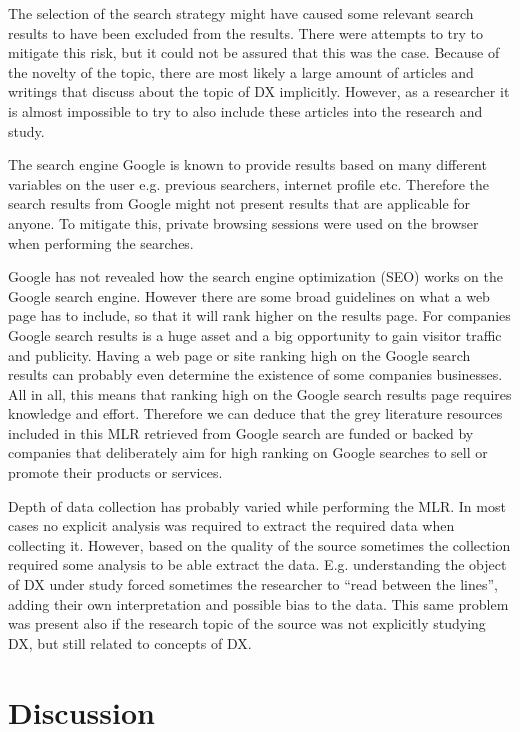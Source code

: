 \documentclass[english, 12pt, a4paper, sci, utf8, a-1b, online]{aaltothesis}
\begin{document}
The selection of the search strategy might have caused some relevant search results to have been excluded from the results. There were attempts to try to mitigate this risk, but it could not be assured that this was the case. Because of the novelty of the topic, there are most likely a large amount of articles and writings that discuss about the topic of DX implicitly. However, as a researcher it is almost impossible to try to also include these articles into the research and study.

The search engine Google is known to provide results based on many different variables on the user e.g. previous searchers, internet profile etc. Therefore the search results from Google might not present results that are applicable for anyone. To mitigate this, private browsing sessions were used on the browser when performing the searches.

Google has not revealed how the search engine optimization (SEO) works on the Google search engine. However there are some broad guidelines on what a web page has to include, so that it will rank higher on the results page. For companies Google search results is a huge asset and a big opportunity to gain visitor traffic and publicity. Having a web page or site ranking high on the Google search results can probably even determine the existence of some companies businesses. All in all, this means that ranking high on the Google search results page requires knowledge and effort. Therefore we can deduce that the grey literature resources included in this MLR retrieved from Google search are funded or backed by companies that deliberately aim for high ranking on Google searches to sell or promote their products or services.

Depth of data collection has probably varied while performing the MLR. In most cases no explicit analysis was required to extract the required data when collecting it. However, based on the quality of the source sometimes the collection required some analysis to be able extract the data. E.g. understanding the object of DX under study forced sometimes the researcher to ``read between the lines'', adding their own interpretation and possible bias to the data. This same problem was present also if the research topic of the source was not explicitly  studying DX, but still related to concepts of DX.

\clearpage
\section{Discussion} \label{section:discussion}
\end{document}
